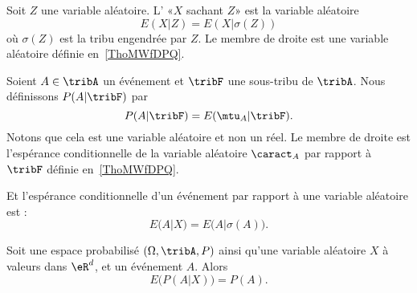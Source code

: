 \begin{definition}      \label{DefooKIHPooMhvirn}
    Soit \( Z\) une variable aléatoire. L' «\( X\) sachant \( Z\)» est la variable aléatoire
    \begin{equation}
        E(X|Z)=E(X|\sigma(Z))
    \end{equation}
    où \( \sigma(Z)\) est la tribu engendrée par \( Z\). Le membre de droite est une variable aléatoire définie en~\ref{ThoMWfDPQ}.
\end{definition}

\begin{definition}      \label{DEFooEYVCooCeyOXW}
    Soient \( A\in\tribA\) un événement et \( \tribF\) une sous-tribu de \( \tribA\). Nous définissons \( P(A|\tribF)\) par
    \begin{equation}
        P(A|\tribF)=E(\mtu_{A}|\tribF).
    \end{equation}
    Notons que cela est une variable aléatoire et non un réel. Le membre de droite est l'espérance conditionnelle de la variable aléatoire \( \caract_A\) par rapport à \( \tribF\) définie en~\ref{ThoMWfDPQ}.

    Et l'espérance conditionnelle d'un événement par rapport à une variable aléatoire est :
    \begin{equation}
        E(A|X)=E\big( A|\sigma(A) \big).
    \end{equation}
\end{definition}


\begin{proposition}
    Soit une espace probabilisé \( (\Omega,\tribA,P)\) ainsi qu'une variable aléatoire \( X\) à valeurs dans \( \eR^d\), et un événement \( A\). Alors
    \begin{equation}
        E\big( P(A|X) \big)=P(A).
    \end{equation}
\end{proposition}

